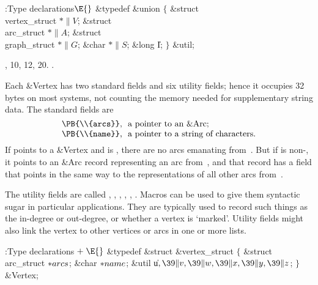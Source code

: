\Y\B\4:Type declarations\X${}\E{}$\6
\&{typedef} \&{union} ${}\{{}$\1\6
\&{struct} \\{vertex\_struct} ${}{*}\|V{}$;\6
\&{struct} \\{arc\_struct} ${}{*}\|A{}$;\6
\&{struct} \\{graph\_struct} ${}{*}\|G{}$;\6
\&{char} ${}{*}\|S{}$;\6
\&{long} \|I;\2\6
${}\}{}$ \&{util};\par
{}, 10, 12, 20.
.\fi

Each \&{Vertex} has two standard fields and six utility fields; hence it
occupies 32 bytes on most systems, not counting the memory needed for
supplementary string data. The standard fields are
$$\vcenter{\halign{#,\ \ \hfil&#\hfil\cr
\PB{\\{arcs}}&a pointer to an \&{Arc};\cr
\PB{\\{name}}&a pointer to a string of characters.\cr}}$$
If  points to a \&{Vertex} and  is \PB{$\NULL$},
there are no arcs
emanating from~. But if  is non-\PB{$\NULL$}, it
points to an \&{Arc}
record representing an arc from~, and that record has a 
field that
points in the same way to the representations of all other arcs from~.

The utility fields are called , , , , ,
. Macros can
be used to give them syntactic sugar in particular applications. They are
typically used to record such things as the in-degree or out-degree, or
whether a vertex is `marked'. Utility fields might also link the vertex
to other vertices or arcs in one or more lists.

\Y\B\4:Type declarations\X${}\mathrel+\E{}$\6
\&{typedef} \&{struct} \&{vertex\_struct} ${}\{{}$\1\6
\&{struct} \\{arc\_struct} ${}{*}\\{arcs}{}$;\6
\&{char} ${}{*}\\{name}{}$;\6
\&{util} \|u${},\39\|v,\39\|w,\39\|x,\39\|y,\39\|z{}$;%
\2\6
${}\}{}$ \&{Vertex};\par
\fi

